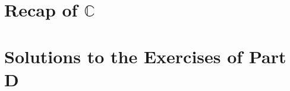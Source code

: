 \chapter{Recap of \texorpdfstring{$\pmb{\mathbb{C}}$}{C}}
\section{}
\chapter{Solutions to the Exercises of Part D}